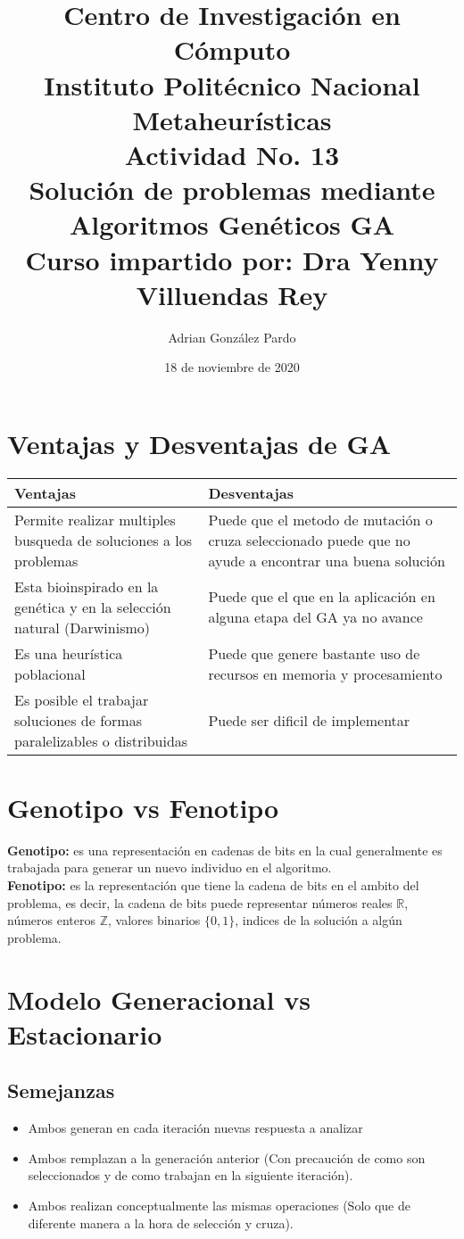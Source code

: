 \documentclass[10pt]{article}
\title{Centro de Investigación en Cómputo\\Instituto Politécnico Nacional\\Metaheurísticas\\Actividad No. 13\\ Solución de problemas mediante Algoritmos Genéticos GA\\Curso impartido por: Dra Yenny Villuendas Rey}
\author{Adrian González Pardo}
\date{18 de noviembre de 2020}
\begin{document}
\maketitle
\section{Ventajas y Desventajas de GA}
\begin{center}
  \begin{tabular}{|p{6cm}|p{6cm}|}
    \hline
    Ventajas & Desventajas \\
    \hline
    Permite realizar multiples busqueda de soluciones a los problemas & Puede que el metodo de mutación o cruza seleccionado puede que no ayude a encontrar una buena solución\\
    \hline
    Esta bioinspirado en la genética y en la selección natural (Darwinismo) & Puede que el que en la aplicación en alguna etapa del GA ya no avance \\
    \hline
    Es una heurística poblacional & Puede que genere bastante uso de recursos en memoria y procesamiento \\
    \hline
    Es posible el trabajar soluciones de formas paralelizables o distribuidas&Puede ser dificil de implementar\\
    \hline
  \end{tabular}
\end{center}
\section{Genotipo vs Fenotipo}
\textbf{Genotipo:} es una representación en cadenas de bits en la cual generalmente es trabajada para generar un nuevo individuo en el algoritmo.
\\
\textbf{Fenotipo:} es la representación que tiene la cadena de bits en el ambito del problema, es decir, la cadena de bits puede representar números reales $\mathbb{R}$, números enteros $\mathbb{Z}$, valores binarios $\{0,1\}$, indices de la solución a algún problema.
\section{Modelo Generacional vs Estacionario}
\subsection{Semejanzas}
\begin{itemize}
  \item Ambos generan en cada iteración nuevas respuesta a analizar
  \item Ambos remplazan a la generación anterior (Con precaución de como son seleccionados y de como trabajan en la siguiente iteración).
  \item Ambos realizan conceptualmente las mismas operaciones (Solo que de diferente manera a la hora de selección y cruza).
\end{itemize}
\end{document}
